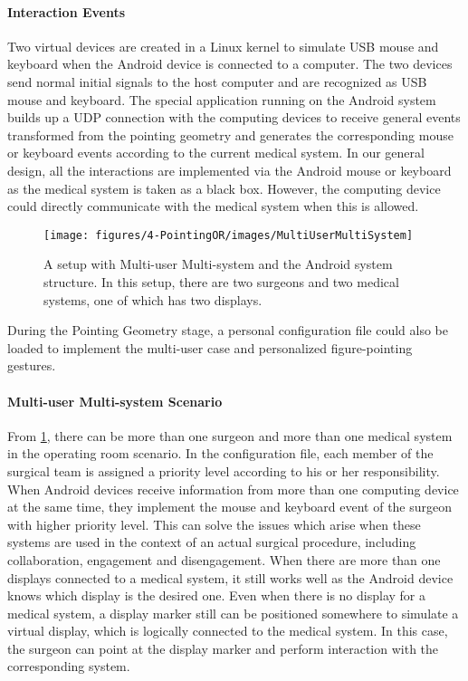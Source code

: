 \paragraph{Interaction Events}
Two virtual devices are created in a Linux kernel to simulate USB mouse and keyboard when the Android device is connected to a computer. The two devices send normal initial signals to the host computer and are recognized as USB mouse and keyboard. The special application running on the Android system builds up a UDP connection with the computing devices to receive general events transformed from the pointing geometry and generates the corresponding mouse or keyboard events according to the current medical system. In our general design, all the interactions are implemented via the Android mouse or keyboard as the medical system is taken as a black box. However, the computing device could directly communicate with the medical system when this is allowed. 
\begin{figure}
	\centering
	\texttt{[image: figures/4-PointingOR/images/MultiUserMultiSystem]}
	\caption{A setup with Multi-user Multi-system and the Android system structure. In this setup, there are two surgeons and two medical systems, one of which has two displays. }
	\label{fig:multiUserMultiSystem}       %
\end{figure}
During the Pointing Geometry stage, a personal configuration file could also be loaded to implement the multi-user case and personalized figure-pointing gestures. 
\paragraph{Multi-user Multi-system Scenario}
From \figurename{\ref{fig:multiUserMultiSystem}}, there can be more than one surgeon and more than one medical system in the operating room scenario. In the configuration file, each member of the surgical team is assigned a priority level according to his or her responsibility. When Android devices receive information from more than one computing device at the same time, they implement the mouse and keyboard event of the surgeon with higher priority level. This can solve the issues which arise when these systems are used in the context of an actual surgical procedure, including collaboration, engagement and disengagement. When there are more than one displays connected to a medical system, it still works well as the Android device knows which display is the desired one. Even when there is no display for a medical system, a display marker still can be positioned somewhere to simulate a virtual display, which is logically connected to the medical system. In this case, the surgeon can point at the display marker and perform interaction with the corresponding system.
